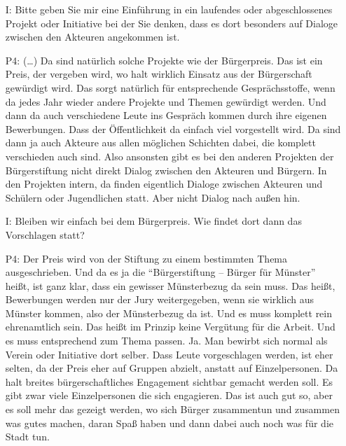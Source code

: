 \begin{itemize}
    \item[I:] Bitte geben Sie mir eine Einf{\"u}hrung in ein laufendes oder abgeschlossenes Projekt oder Initiative bei der Sie denken, dass es dort besonders auf Dialoge zwischen den Akteuren angekommen ist.
    \item[P4:] (\dots) Da sind nat{\"u}rlich solche Projekte wie der B{\"u}rgerpreis. Das ist ein Preis, der vergeben wird, wo halt wirklich Einsatz  aus der B{\"u}rgerschaft gew{\"u}rdigt wird. Das sorgt nat{\"u}rlich f{\"u}r entsprechende Gespr{\"a}chsstoffe, wenn da jedes Jahr wieder andere Projekte und Themen gew{\"u}rdigt werden. Und dann da auch verschiedene Leute ins Gespr{\"a}ch kommen durch ihre eigenen Bewerbungen. Dass der {\"O}ffentlichkeit da einfach viel vorgestellt wird. Da sind dann ja auch Akteure aus allen m{\"o}glichen Schichten dabei, die komplett verschieden auch sind. Also ansonsten gibt es bei den anderen Projekten der B{\"u}rgerstiftung nicht direkt Dialog zwischen den Akteuren und B{\"u}rgern. In den Projekten intern, da finden eigentlich Dialoge zwischen Akteuren und Sch{\"u}lern oder Jugendlichen statt. Aber nicht Dialog nach au{\ss}en hin.
    \item[I:] Bleiben wir einfach bei dem B{\"u}rgerpreis. Wie findet dort dann das Vorschlagen statt?
    \item[P4:] Der Preis wird von der Stiftung zu einem bestimmten Thema ausgeschrieben. Und da es ja die "`B{\"u}rgerstiftung -- B{\"u}rger f{\"u}r M{\"u}nster"' hei{\ss}t, ist ganz klar, dass ein gewisser M{\"u}nsterbezug da sein muss. Das hei{\ss}t, Bewerbungen werden nur der Jury weitergegeben, wenn sie wirklich aus M{\"u}nster kommen, also der M{\"u}nsterbezug da ist. Und es muss komplett rein ehrenamtlich sein. Das hei{\ss}t im Prinzip keine Verg{\"u}tung f{\"u}r die Arbeit. Und es muss entsprechend zum Thema passen. Ja. Man bewirbt sich normal als Verein oder Initiative dort selber. Dass Leute vorgeschlagen werden, ist eher selten, da der Preis eher auf Gruppen abzielt, anstatt auf Einzelpersonen. Da halt breites b{\"u}rgerschaftliches Engagement sichtbar gemacht werden soll. Es gibt zwar viele Einzelpersonen die sich engagieren. Das ist auch gut so, aber es soll mehr das gezeigt werden, wo sich B{\"u}rger zusammentun und zusammen was gutes machen, daran Spa{\ss} haben und dann dabei auch noch was f{\"u}r die Stadt tun.
\end{itemize}

